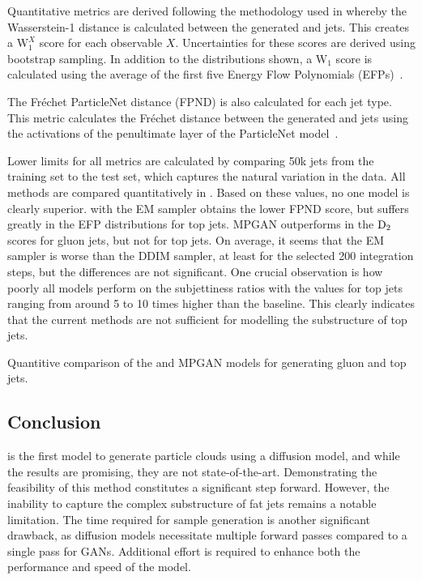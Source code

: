 Quantitative metrics are derived following the methodology used in \textcite{MPGAN} whereby the Wasserstein-1 distance is calculated between the generated and \pythia jets.
This creates a $\text{W}_1^X$ score for each observable $X$.
Uncertainties for these scores are derived using bootstrap sampling.
In addition to the distributions shown, a $\text{W}_1$ score is calculated using the average of the first five Energy Flow Polynomials (EFPs)~\cite{EFP}.

The Fréchet ParticleNet distance (FPND) is also calculated for each jet type.
This metric calculates the Fréchet distance between the generated and \pythia jets using the activations of the penultimate layer of the ParticleNet model~\cite{MPGAN, ParticleNet}.

Lower limits for all metrics are calculated by comparing 50k jets from the training set to the test set, which captures the natural variation in the data.
All methods are compared quantitatively in .
Based on these values, no one model is clearly superior.
\pcjedi with the EM sampler obtains the lower FPND score, but suffers greatly in the EFP distributions for top jets.
MPGAN outperforms \pcjedi in the $\text{D}_2$ scores for gluon jets, but not for top jets.
On average, it seems that the EM sampler is worse than the DDIM sampler, at least for the selected 200 integration steps, but the differences are not significant.
One crucial observation is how poorly all models perform on the subjettiness ratios with the values for top jets ranging from around 5 to 10 times higher than the \pythia baseline.
This clearly indicates that the current methods are not sufficient for modelling the substructure of top jets.

\begin{table}[tp]
    \centering
    \caption{Quantitive comparison of the \pcjedi and MPGAN models for generating gluon and top jets.}
    \label{tab:combined_results}
    \renewcommand{\arraystretch}{1.5}
    \resizebox{\textwidth}{!}{%
        
    }
\end{table}

\subsection{Conclusion}

\pcjedi is the first model to generate particle clouds using a diffusion model, and while the results are promising, they are not state-of-the-art.
Demonstrating the feasibility of this method constitutes a significant step forward.
However, the inability to capture the complex substructure of fat jets remains a notable limitation.
The time required for sample generation is another significant drawback, as diffusion models necessitate multiple forward passes compared to a single pass for GANs.
Additional effort is required to enhance both the performance and speed of the model.

